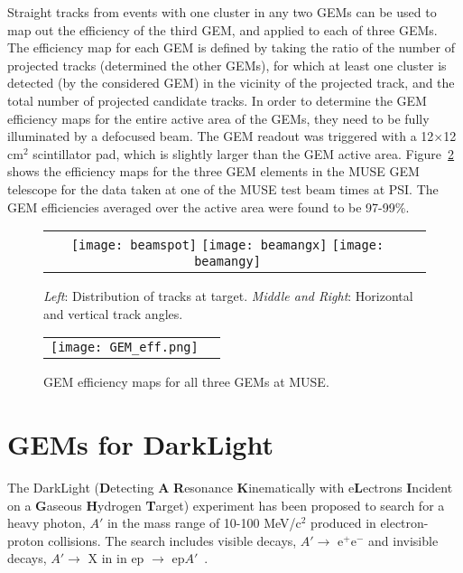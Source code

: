 \documentclass{PoS}
\begin{document}
Straight tracks from events with one cluster in any two GEMs can be used
to map out the efficiency of the third GEM, and applied to each of three GEMs.
The efficiency map for each GEM is defined by taking the ratio of the
number of projected tracks (determined the other GEMs), for which at least
one cluster is detected (by the considered GEM) in the vicinity of the
projected track, and the total number of projected candidate tracks.
In order to determine the GEM efficiency maps for the entire active area of the
GEMs, they need to be fully illuminated by a defocused beam. The GEM readout
was triggered with a 12$\times$12 cm$^2$ scintillator pad, which is
slightly larger than the GEM active area. Figure~\ref{gem_eff} shows the
efficiency maps for the three GEM elements in the MUSE GEM telescope for the
data taken at one of the MUSE test beam times at PSI. The GEM efficiencies
averaged over the active area were found to be 97-99\%.
\begin{figure}[t] %
\centering
\begin{tabular}{cc}
\mbox{\texttt{[image: beamspot]}}
\mbox{\texttt{[image: beamangx]}}
\mbox{\texttt{[image: beamangy]}}
\end{tabular}
\caption{\emph{Left}: Distribution of tracks at target.
  \emph{Middle and Right}: Horizontal and vertical track angles.}
\label{clust_tracks} 
\end{figure}

\begin{figure}[t] 
\centering
\begin{tabular}{cc}
\mbox{\texttt{[image: GEM\_eff.png]}}
\end{tabular}
\caption{GEM efficiency maps for all three GEMs at MUSE.} 
\label{gem_eff} 
\end{figure}

\section{GEMs for DarkLight}

The DarkLight ({\bf{D}}etecting {\bf{A}} {\bf{R}}esonance
{\bf{K}}inematically with e{\bf{L}}ectrons {\bf{I}}ncident on a
{\bf{G}}aseous {\bf{H}}ydrogen {\bf{T}}arget) experiment has been proposed to
search for a heavy photon, $A'$ in the mass range of 10-100 MeV/c$^2$
produced in electron-proton collisions. The search includes visible decays,
$A' \rightarrow$ e$^+$e$^-$ and invisible decays, $A' \rightarrow$ X in
in ep $\rightarrow$ ep$A'$~\cite{DL}.
 
\end{document}
